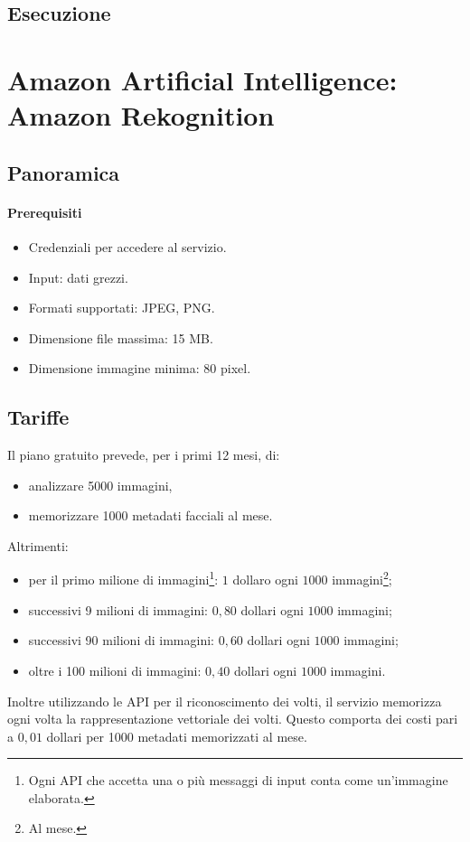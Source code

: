 \documentclass[fleqn,a4paper,11pt]{report}
\begin{document}
\subsection{Esecuzione}

\section{Amazon Artificial Intelligence: Amazon Rekognition}
\subsection{Panoramica}
\paragraph{Prerequisiti}
\begin{itemize}
\item Credenziali per accedere al servizio.
\item Input: dati grezzi.
\item Formati supportati: JPEG, PNG.
\item Dimensione file massima: 15 MB.
\item Dimensione immagine minima: 80 pixel.
\end{itemize}
%

\subsection{Tariffe}
Il piano gratuito prevede, per i primi 12 mesi, di:
\begin{itemize}
\item analizzare 5000 immagini,
\item memorizzare 1000 metadati facciali al mese.
\end{itemize}
Altrimenti:
\begin{itemize}
\item per il primo milione di immagini\footnote{Ogni API che accetta una o più messaggi di input conta come un'immagine elaborata.}: $1$ dollaro ogni $1000$ immagini\footnote{Al mese.};
\item successivi 9 milioni di immagini: $0,80$ dollari ogni $1000$ immagini;
\item successivi 90 milioni di immagini: $0,60$ dollari ogni $1000$ immagini;
\item oltre i 100 milioni di immagini: $0,40$ dollari ogni $1000$ immagini.
\end{itemize}
Inoltre utilizzando le API per il riconoscimento dei volti, il servizio memorizza ogni volta la rappresentazione vettoriale dei volti. Questo comporta dei costi pari a $0,01$ dollari per 1000 metadati memorizzati al mese.  
\end{document}

